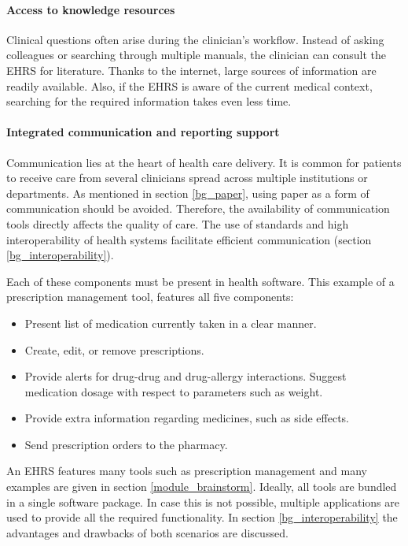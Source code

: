     \paragraph{Access to knowledge resources} Clinical questions often arise during the clinician's workflow. Instead of asking colleagues or searching through multiple manuals, the clinician can consult the EHRS for literature. Thanks to the internet, large sources of information are readily available. Also, if the EHRS is aware of the current medical context, searching for the required information takes even less time. 

    \paragraph{Integrated communication and reporting support} Communication lies at the heart of health care delivery. It is common for patients to receive care from several clinicians spread across multiple institutions or departments. As mentioned in section \ref{bg_paper}, using paper as a form of communication should be avoided. Therefore, the availability of communication tools directly affects the quality of care. The use of standards and high interoperability of health systems facilitate efficient communication (section \ref{bg_interoperability}).\bigskip %

    \noindent Each of these components must be present in health software. This example of a prescription management tool, features all five components:
    \begin{itemize}
        \item Present list of medication currently taken in a clear manner.
        \item Create, edit, or remove prescriptions.
        \item Provide alerts for drug-drug and drug-allergy interactions. Suggest medication dosage with respect to parameters such as weight.
        \item Provide extra information regarding medicines, such as side effects.
        \item Send prescription orders to the pharmacy.
    \end{itemize}

    \noindent An EHRS features many tools such as prescription management and many examples are given in section \ref{module_brainstorm}. Ideally, all tools are bundled in a single software package. In case this is not possible, multiple applications are used to provide all the required functionality. In section \ref{bg_interoperability} the advantages and drawbacks of both scenarios are discussed. %

